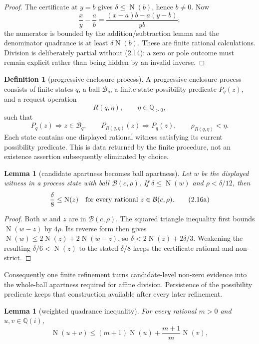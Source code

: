 \documentclass[10pt]{article}
\newtheorem{lemma}[theorem]{Lemma}
\theoremstyle{definition}
\newtheorem{definition}[theorem]{Definition}
\theoremstyle{remark}
\newcommand{\Q}{\mathbb{Q}}
\newcommand{\Qi}{\mathbb{Q}(i)}
\newcommand{\Norm}{\operatorname{N}}
\begin{document}
\begin{proof}
The certificate at $y=b$ gives $\delta\le\Norm(b)$, hence $b\ne0$.  Now
\[
 \frac{x}{y}-\frac ab
 =\frac{(x-a)b-a(y-b)}{yb};
\]
the numerator is bounded by the addition/subtraction lemma and the
denominator quadrance is at least $\delta\Norm(b)$.  These are finite
rational calculations.  Division is deliberately partial without (2.14):
a zero or pole outcome must remain explicit rather than being hidden by an
invalid inverse.
\end{proof}

\begin{definition}[progressive enclosure process]
A progressive enclosure process consists of finite states $q$, a ball
$\mathcal B_q$, a finite-state possibility predicate $P_q(z)$, and a request
operation
\[
 R(q,\eta),\qquad \eta\in\Q_{>0},
\]
such that
\[
 P_q(z)\Longrightarrow z\in\mathcal B_q,
 \qquad
 P_{R(q,\eta)}(z)\Longrightarrow P_q(z),
 \qquad
 \rho_{R(q,\eta)}<\eta.
\tag{2.16}
\]
Each state contains one displayed rational witness satisfying its current
possibility predicate.  This is data returned by the finite procedure, not an
existence assertion subsequently eliminated by choice.
\end{definition}

\begin{lemma}[candidate apartness becomes ball apartness]
Let $w$ be the displayed witness in a process state with ball
$\mathcal B(c,\rho)$.  If $\delta\le\Norm(w)$ and
$\rho<\delta/12$, then
\[
 \frac{\delta}{8}\le\Norm(z)
 \quad\hbox{for every rational }z\in\mathcal B(c,\rho).
\tag{2.16a}
\]
\end{lemma}

\begin{proof}
Both $w$ and $z$ are in $\mathcal B(c,\rho)$.  The squared triangle
inequality first bounds $\Norm(w-z)$ by $4\rho$.  Its reverse form then gives
$\Norm(w)\le2\Norm(z)+2\Norm(w-z)$, so
$\delta<2\Norm(z)+2\delta/3$.  Weakening the resulting
$\delta/6<\Norm(z)$ to the stated $\delta/8$ keeps the certificate rational
and non-strict.
\end{proof}

Consequently one finite refinement turns candidate-level non-zero evidence
into the whole-ball apartness required for affine division.  Persistence of
the possibility predicate keeps that construction available after every
later refinement.

\begin{lemma}[weighted quadrance inequality]
For every rational $m>0$ and $u,v\in\Qi$,
\[
 \Norm(u+v)\le(m+1)\Norm(u)+\frac{m+1}{m}\Norm(v),
\tag{2.16b}
\]
\end{lemma}
\end{document}
